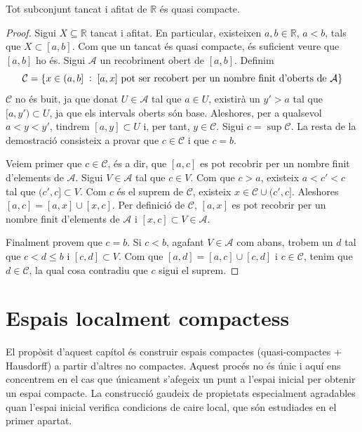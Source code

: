 \documentclass[../main.tex]{subfiles}
\begin{document}
\begin{ter}
\label{ter:teoremadeheineborel} Tot subconjunt tancat i afitat de $\mathbb{R}$ és quasi compacte.
\end{ter}
\begin{proof}
Sigui $X\subseteq\mathbb{R}$ tancat i afitat. En particular, existeixen $a,b\in\mathbb{R}$, $a<b$, tals que $X\subset [a,b]$. Com que un tancat és quasi compacte, és suficient veure que $[a,b]$ ho és. Sigui $\mathcal{A}$ un recobriment obert de $[a,b]$. Definim
\begin{equation}
    \notag
    \mathcal{C} = \{x\in(a,b]\;:\;\text{$[a,x]$ pot ser recobert per un nombre finit d'oberts de $\mathcal{A}$}\}
\end{equation}
$\mathcal{C}$ no és buit, ja que donat $U\in\mathcal{A}$ tal que $a\in U$, existirà un $y'>a$ tal que $[a,y')\subset U$, ja que els intervals oberts són base. Aleshores, per a qualsevol $a<y<y'$, tindrem $[a,y]\subset U$ i, per tant, $y\in\mathcal{C}$. Sigui $c = \sup\mathcal{C}$. La resta de la demostració consisteix a provar que $c\in\mathcal{C}$ i que $c = b$.

Veiem primer que $c\in\mathcal{C}$, és a dir, que $[a,c]$ es pot recobrir per un nombre finit d'elements de $\mathcal{A}$. Sigui $V\in\mathcal{A}$ tal que $c\in V$. Com que $c>a$, existeix $a<c'<c$ tal que $(c',c]\subset V$. Com $c$ és el suprem de $\mathcal{C}$, existeix $x\in\mathcal{C}\cup (c',c]$. Aleshores $[a,c]=[a,x]\cup[x,c]$. Per definició de $\mathcal{C}$, $[a,x]$ es pot recobrir per un nombre finit d'elements de $\mathcal{A}$ i $[x,c]\subset V\in\mathcal{A}$.

Finalment provem que $c = b$. Si $c<b$, agafant $V\in\mathcal{A}$ com abans, trobem un $d$ tal que $c<d\leq b$ i $[c,d]\subset V$. Com que $[a,d] = [a,c]\cup[c,d]$ i $c\in\mathcal{C}$, tenim que $d\in\mathcal{C}$, la qual cosa contradiu que $c$ sigui el suprem.
\end{proof}









\section{Espais localment compactess}

El propòsit d'aquest capítol és construir espais compactes (quasi-compactes + Hausdorff) a partir d'altres no compactes. Aquest procés no és únic i aquí ens concentrem en el cas que únicament s'afegeix un punt a l'espai inicial per obtenir un espai compacte. La construcció gaudeix de propietats especialment agradables quan l'espai inicial verifica condicions de caire local, que són estudiades en el primer apartat.
\end{document}
